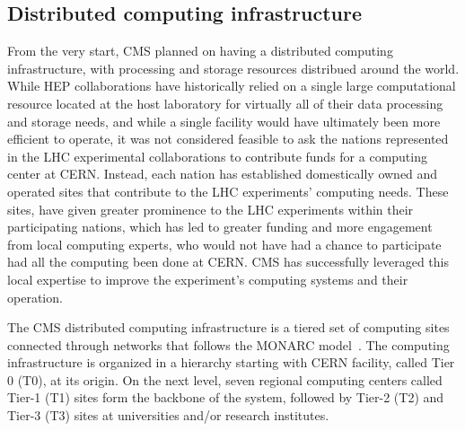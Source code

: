\subsection{Distributed computing infrastructure}





From the very start, CMS planned on having a distributed computing
infrastructure, with processing and storage resources distribued around the
world.  While HEP collaborations have historically relied on a single large
computational resource located at the host laboratory for virtually all of
their data processing and storage needs, and while a single facility would
have ultimately been more efficient to operate, it was not considered
feasible to ask the nations represented in the LHC experimental
collaborations to contribute funds for a computing center at CERN.
Instead, each nation has established domestically owned and operated sites
that contribute to the LHC experiments' computing needs.  These sites, have
given greater prominence to the LHC experiments within their participating
nations, which has led to greater funding and more engagement from local
computing experts, who would not have had a chance to participate had all
the computing been done at CERN.  CMS has successfully leveraged this local
expertise to improve the experiment's computing systems and their
operation.

The CMS distributed computing infrastructure is a tiered set of computing
sites connected through networks that follows the MONARC
model~\cite{MONARC}. The computing infrastructure is organized in a
hierarchy starting with CERN facility, called Tier 0 (T0), at its origin.
On the next level, seven regional computing centers called Tier-1 (T1)
sites form the backbone of the system, followed by Tier-2 (T2) and Tier-3
(T3) sites at universities and/or research institutes.

